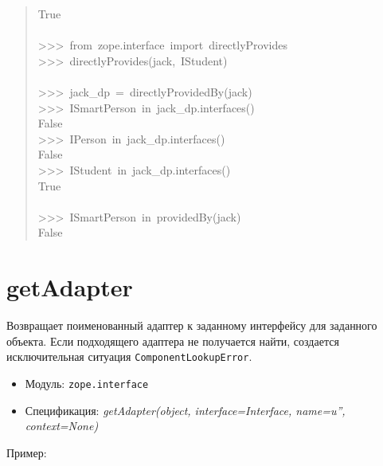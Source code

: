 \documentclass[a4paper,openany,twoside,final]{book}
\providecommand*{\DUroletitlereference}[1]{\textsl{#1}}
\begin{document}
\begin{quote}
{True\\
~\\
>{}>{}>~from~zope.interface~import~directlyProvides\\
>{}>{}>~directlyProvides(jack,~IStudent)\\
~\\
>{}>{}>~jack\_dp~=~directlyProvidedBy(jack)\\
>{}>{}>~ISmartPerson~in~jack\_dp.interfaces()\\
False\\
>{}>{}>~IPerson~in~jack\_dp.interfaces()\\
False\\
>{}>{}>~IStudent~in~jack\_dp.interfaces()\\
True\\
~\\
>{}>{}>~ISmartPerson~in~providedBy(jack)\\
False
}
\end{quote}


\section*{getAdapter%
  \label{getadapter}%
}

Возвращает поименованный адаптер к заданному интерфейсу для заданного
объекта.  Если подходящего адаптера не получается найти, создается
исключительная ситуация \texttt{ComponentLookupError}.

\begin{itemize}

\item Модуль: \texttt{zope.interface}

\item Спецификация: \DUroletitlereference{getAdapter(object, interface=Interface, name=u'', context=None)}

\end{itemize}

Пример:
\end{document}
